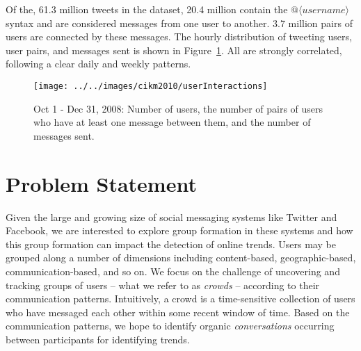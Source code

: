 \documentclass{sig-alternate}
\begin{document}
Of the, 61.3 million tweets in the dataset, 20.4 million contain the $@\langle
username \rangle$ syntax and are considered messages from one user to another.
3.7 million pairs of users are connected by these messages. The hourly
distribution of tweeting users, user pairs, and messages sent is shown in
Figure~\ref{fig:data-distribution}. All are strongly correlated, following a
clear daily and weekly patterns.

\begin{figure}[!t]
\begin{center}
\texttt{[image: ../../images/cikm2010/userInteractions]}
\caption{Oct 1 - Dec 31, 2008: Number of users, the number of pairs of users
who have at least one message between them, and the number of messages sent.}
\label{fig:data-distribution}
\end{center}
\end{figure}



\section{Problem Statement}
Given the large and growing size of social messaging systems like Twitter and Facebook,  we are interested to explore group formation in these systems and how this group formation can impact the detection of online trends.  Users may be grouped along a number of dimensions including content-based, geographic-based, communication-based, and so on. We focus on the challenge of uncovering and tracking groups of users -- what we refer to as \textit{crowds} -- according to their communication patterns. Intuitively, a crowd is a time-sensitive collection of users who have messaged each other within some recent window of time. Based on the communication patterns, we hope to identify organic \textit{conversations} occurring between participants for identifying trends.



\end{document}
